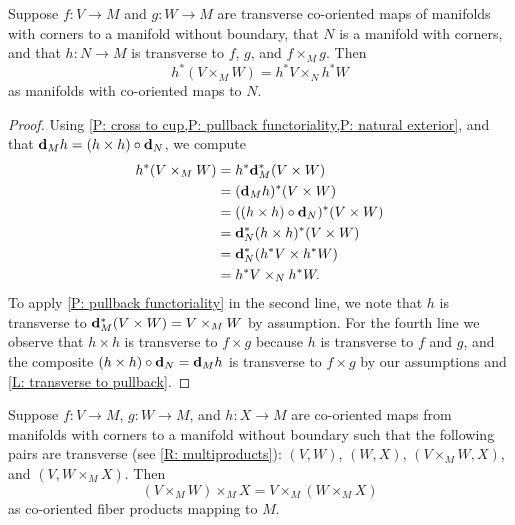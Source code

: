 \begin{corollary}\label{C: fiber natural pullback}
	Suppose $f \colon V \to M$ and $g \colon W \to M$ are transverse co-oriented maps of manifolds with corners to a manifold without boundary, that $N$ is a manifold with corners, and that $h \colon N \to M$ is transverse to $f$, $g$, and $f \times_M g$.
	Then
	$$h^*(V \times_M W) = h^*V \times_N h^*W$$
	as manifolds with co-oriented maps to $N$.
\end{corollary}

\begin{proof}
	Using \cref{P: cross to cup,P: pullback functoriality,P: natural exterior}, and that $\mathbf{d}_M h = (h \times h) \circ \mathbf{d}_N$,
	we compute
	\begin{align*}
		h^*(V \times_M W)& = h^*\mathbf{d}_M^*(V \times W)\\
		& = (\mathbf{d}_M h)^*(V \times W)\\
		& = ((h \times h) \circ \mathbf{d}_N)^*(V \times W)\\
		& = \mathbf{d}_N^*(h \times h)^*(V \times W)\\
		& = \mathbf{d}_N^*(h^*V \times h^*W)\\
		& = h^*V \times_N h^*W.
	\end{align*}
	To apply \cref{P: pullback functoriality} in the second line, we note that $h$ is transverse to $\mathbf{d}_M^*(V \times W) = V \times_M W$ by assumption.
	For the fourth line we observe that $h \times h$ is transverse to $f \times g$ because $h$ is transverse to $f$ and $g$, and the composite $(h \times h) \circ \mathbf{d}_N = \mathbf{d}_M h$ is transverse to $f \times g$ by our assumptions and \cref{L: transverse to pullback}.
\end{proof}

\begin{corollary}\label{C: fiber assoc}
	Suppose $f \colon V \to M$, $g \colon W \to M$, and $h \colon X \to M$ are co-oriented maps from manifolds with corners to a manifold without boundary such that the following pairs are transverse (see \cref{R: multiproducts}): $(V,W)$, $(W,X)$, $(V \times_M W,X)$, and $(V,W \times_M X)$.
	Then $$(V \times_M W) \times_M X = V \times_M (W \times_M X)$$ as co-oriented fiber products mapping to $M$.
\end{corollary}

